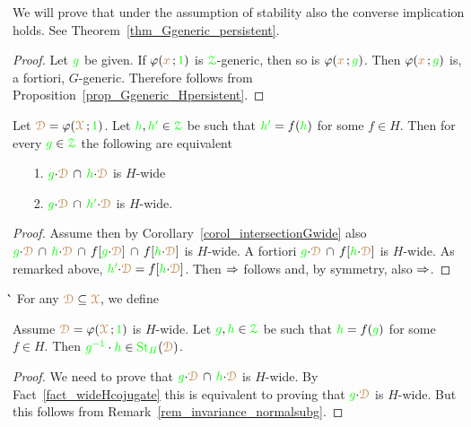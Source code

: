 We will prove that under the assumption of stability also the converse implication holds.
See Theorem~\ref{thm_Ggeneric_persistent}.\vspace*{-0.5\baselineskip}
%
\begin{proof}
  Let ${\gr g}$ be given.
  If $\phi({\mr x}\,;{\gr 1})$ is $\grZ$-generic, then so is $\phi({\mr x}\,;{\gr g})$.
  Then $\phi({\mr x}\,;{\gr g})$ is, a fortiori, $G$-generic.
  Therefore  follows from Proposition~\ref{prop_Ggeneric_Hpersistent}.
\end{proof}

\begin{fact}\label{fact_wideHcojugate}
  Let $\mrD=\phi(\mrX\,;{\gr 1})$.
  Let ${\gr h},{\gr h'}\in\grZ$ be such that ${\gr h'}=f({\gr h})$ for some $f\in H$.
  Then for every ${\gr g}\in\grZ$ the following are equivalent
  \begin{itemize}
    \item [1.] ${\gr g}{\cdot}\mrD\,\cap\,{\gr h}{\cdot}\mrD$ is $H$-wide
    \item [2.] ${\gr g}{\cdot}\mrD\,\cap\,{\gr h'}{\cdot}\mrD$ is $H$-wide.
  \end{itemize}
\end{fact}

\begin{proof}
  Assume  then by Corollary~\ref{corol_intersectionGwide} also ${\gr g}{\cdot}\mrD\,\cap\,{\gr h}{\cdot}\mrD\,\cap\, f[{\gr g}{\cdot}\mrD]\,\cap\, f[{\gr h}{\cdot}\mrD]$ is $H$-wide.
  A fortiori ${\gr g}{\cdot}\mrD\,\cap\, f[{\gr h}{\cdot}\mrD]$ is $H$-wide.
  As remarked above, ${\gr h'}{\cdot}\mrD=f[{\gr h}{\cdot}\mrD]$.
  Then $\IMP$ follows and, by symmetry, also $\IMP$.
\end{proof}
̀̀
For any $\mrD\subseteq\mrX$, we define 


\begin{fact}
  Assume $\mrD=\phi(\mrX\,;{\gr 1})$ is $H$-wide.
  Let ${\gr g},{\gr h}\in\grZ$ be such that ${\gr h}=f({\gr g})$ for some $f\in H$.
  Then ${\gr g^{-1}}\cdot{\gr h}\in{\gr\St_H}(\mrD)$.
\end{fact}

\begin{proof}
  We need to prove that ${\gr g}{\cdot}\mrD\,\cap\,{\gr h}{\cdot}\mrD$ is $H$-wide.
  By Fact~\ref{fact_wideHcojugate} this is equivalent to proving that ${\gr g}{\cdot}\mrD$ is $H$-wide.
  But this follows from Remark~\ref{rem_invariance_normalsubg}.
\end{proof}

